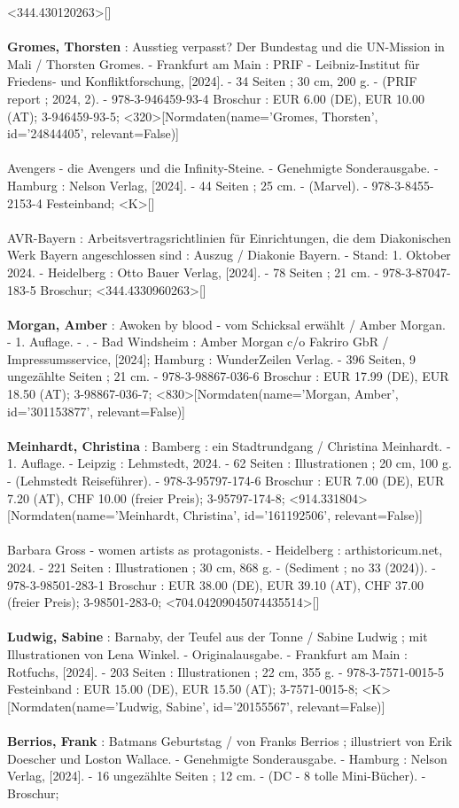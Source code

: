 \documentclass{article}
\begin{document}
\begin{multicols}{3}
<344.430120263>[]\\\\\textbf{Gromes, Thorsten} : Ausstieg verpasst? Der Bundestag und die UN-Mission in Mali / Thorsten Gromes. - Frankfurt am Main : PRIF - Leibniz-Institut für Friedens- und Konfliktforschung, [2024]. - 34 Seiten ; 30 cm, 200 g. - (PRIF report ; 2024, 2). - 978-3-946459-93-4 Broschur : EUR 6.00 (DE), EUR 10.00 (AT); 3-946459-93-5; <320>[Normdaten(name='Gromes, Thorsten', id='24844405', relevant=False)]\\\\Avengers - die Avengers und die Infinity-Steine. - Genehmigte Sonderausgabe. - Hamburg : Nelson Verlag, [2024]. - 44 Seiten ; 25 cm. - (Marvel). - 978-3-8455-2153-4 Festeinband; <K>[]\\\\AVR-Bayern : Arbeitsvertragsrichtlinien für Einrichtungen, die dem Diakonischen Werk Bayern angeschlossen sind : Auszug / Diakonie Bayern. - Stand: 1. Oktober 2024. - Heidelberg : Otto Bauer Verlag, [2024]. - 78 Seiten ; 21 cm. - 978-3-87047-183-5 Broschur; <344.4330960263>[]\\\\\textbf{Morgan, Amber} : Awoken by blood - vom Schicksal erwählt / Amber Morgan. - 1. Auflage. - . - Bad Windsheim : Amber Morgan c/o Fakriro GbR / Impressumsservice, [2024]; Hamburg : WunderZeilen Verlag. - 396 Seiten, 9 ungezählte Seiten ; 21 cm. - 978-3-98867-036-6 Broschur : EUR 17.99 (DE), EUR 18.50 (AT); 3-98867-036-7; <830>[Normdaten(name='Morgan, Amber', id='301153877', relevant=False)]\\\\\textbf{Meinhardt, Christina} : Bamberg : ein Stadtrundgang / Christina Meinhardt. - 1. Auflage. - Leipzig : Lehmstedt, 2024. - 62 Seiten : Illustrationen ; 20 cm, 100 g. - (Lehmstedt Reiseführer). - 978-3-95797-174-6 Broschur : EUR 7.00 (DE), EUR 7.20 (AT), CHF 10.00 (freier Preis); 3-95797-174-8; <914.331804>[Normdaten(name='Meinhardt, Christina', id='161192506', relevant=False)]\\\\Barbara Gross - women artists as protagonists. - Heidelberg : arthistoricum.net, 2024. - 221 Seiten : Illustrationen ; 30 cm, 868 g. - (Sediment ; no 33 (2024)). - 978-3-98501-283-1 Broschur : EUR 38.00 (DE), EUR 39.10 (AT), CHF 37.00 (freier Preis); 3-98501-283-0; <704.04209045074435514>[]\\\\\textbf{Ludwig, Sabine} : Barnaby, der Teufel aus der Tonne / Sabine Ludwig ; mit Illustrationen von Lena Winkel. - Originalausgabe. - Frankfurt am Main : Rotfuchs, [2024]. - 203 Seiten : Illustrationen ; 22 cm, 355 g. - 978-3-7571-0015-5 Festeinband : EUR 15.00 (DE), EUR 15.50 (AT); 3-7571-0015-8; <K>[Normdaten(name='Ludwig, Sabine', id='20155567', relevant=False)]\\\\\textbf{Berrios, Frank} : Batmans Geburtstag / von Franks Berrios ; illustriert von Erik Doescher und Loston Wallace. - Genehmigte Sonderausgabe. - Hamburg : Nelson Verlag, [2024]. - 16 ungezählte Seiten ; 12 cm. - (DC - 8 tolle Mini-Bücher). - Broschur; 
\end{multicols}
\end{document}
